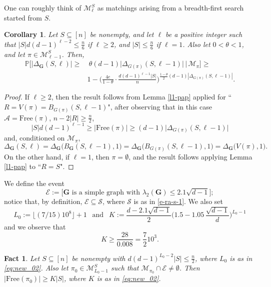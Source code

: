 \documentclass[11pt,leqno]{amsart}
\newtheorem{corollary}[theorem]{Corollary}
\newtheorem{fact}[theorem]{Fact}
\theoremstyle{remark}
\theoremstyle{plain}
\begin{document}
One can roughly think of $\mathcal{M}^S_\ell$ as matchings arising from a breadth-first search started from $S$.
\begin{corollary} \label{c2-pap1}
Let $S\subseteq [n]$ be nonempty, and let $\ell$ be a positive integer such that
$|S|d(d-1)^{\ell-2}\leqslant\frac{n}{6}$ if $\ell\geqslant 2$, and $|S|\leqslant \frac{n}{6}$ if $\ell=1$.
Also let $0<\theta<1$, and let $\pi\in\mathcal{M}^S_{\ell-1}$. Then,
\begin{align*}
\mathbb{P}\Big[ \big|\Delta_{\mathbf{G}}(S,\ell)\big|\geqslant & \
\theta (d-1) \big|\Delta_{G(\pi)}(S,\ell-1)\big| \, \Big| \, \mathcal{M}_{\pi} \Big] \geqslant \\
& 1 - \Big(\frac{4e}{1-\theta}\cdot \frac{d(d-1)^{\ell-1}|S|}{n}
\Big)^{\frac{1-\theta}{2} (d-1) |\Delta_{G(\pi)}(S,\ell-1)|}.
\end{align*}
\end{corollary}
\begin{proof}
If $\ell\geqslant 2$, then the result follows from Lemma \ref{l1-pap} applied for ``$R=V(\pi)=B_{G(\pi)}(S,\ell-1)$",
after observing that in this case $\mathcal{A}=\mathrm{Free}(\pi)$, $n-2|R|\geqslant \frac{n}{2}$,
\[|S|d(d-1)^{\ell-1} \geqslant \big|\mathrm{Free}(\pi)\big|\geqslant (d-1) \big| \Delta_{G(\pi)}(S,\ell-1)\big|\]
and, conditioned on $\mathcal{M}_\pi$,
\[\Delta_{\mathbf{G}}(S,\ell) = \Delta_{\mathbf{G}}\big( B_{\mathbf{G}}(S,\ell-1), 1\big)=
\Delta_{\mathbf{G}}\big( B_{G(\pi)}(S,\ell-1), 1\big)=\Delta_{\mathbf{G}} \big(V(\pi),1\big).  \]
On the other hand, if $\ell=1$, then $\pi=\emptyset$, and the result follows
applying Lemma \ref{l1-pap} to ``$R=S$".
\end{proof}
We define the event
\begin{equation} \label{eq:new_01}
\mathcal{E} := \big[\mathbf{G} \text{ is a simple graph with } \lambda_2(\mathbf{G})\leqslant 2.1\sqrt{d-1}\big];
\end{equation}
notice that, by definition, $\mathcal{E}\subseteq \mathcal{S}$, where $\mathcal{S}$ is as in \eqref{e-ra-s-1}. We also set
\begin{equation}\label{eq:new_02}
L_0 := \big\lfloor(7/15)10^8\big\rfloor+1 \ \ \text{ and } \ \
K := \frac{d-2.1\sqrt{d-1}}{2}\Big( 1.5-1.05\,\frac{\sqrt{d-1}}{d} \Big)^{L_0-1}
\end{equation}
and we observe that
\begin{equation}\label{eq:new_04}
K\geqslant \frac{28}{0.008}=\frac{7}{2}10^3.
\end{equation}
\begin{fact}\label{fact_new_Cheeger_expansion}
Let $S\subseteq [n]$ be nonempty with $d(d-1)^{L_0-2}|S|\leqslant\frac{n}{2}$, where $L_0$ is as in \eqref{eq:new_02}.
Also let $\pi_0\in\mathcal{M}^S_{L_0-1}$ such that $\mathcal{M}_{\pi_0}\cap\mathcal{E}\neq\emptyset$.
Then $|\mathrm{Free}(\pi_0)|\geqslant K |S|$, where $K$ is as in \eqref{eq:new_02}.
\end{fact}
\end{document}
